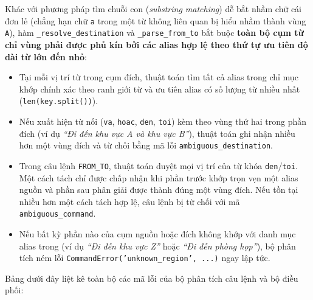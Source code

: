 Khác với phương pháp tìm chuỗi con (\textit{substring matching}) dễ bắt nhầm chữ cái đơn lẻ (chẳng hạn chữ \texttt{a} trong một từ không liên quan bị hiểu nhầm thành vùng \texttt{A}), hàm \texttt{\_resolve\_destination} và \texttt{\_parse\_from\_to} bắt buộc \textbf{toàn bộ cụm từ chỉ vùng phải được phủ kín bởi các alias hợp lệ theo thứ tự ưu tiên độ dài từ lớn đến nhỏ}:
\begin{itemize}[leftmargin=1.2cm]
  \item Tại mỗi vị trí từ trong cụm đích, thuật toán tìm tất cả alias trong chỉ mục khớp chính xác theo ranh giới từ và ưu tiên alias có số lượng từ nhiều nhất (\texttt{len(key.split())}).
  \item Nếu xuất hiện từ nối (\texttt{va}, \texttt{hoac}, \texttt{den}, \texttt{toi}) kèm theo vùng thứ hai trong phần đích (ví dụ \textit{``Đi đến khu vực A và khu vực B''}), thuật toán ghi nhận nhiều hơn một vùng đích và từ chối bằng mã lỗi \texttt{ambiguous\_destination}.
  \item Trong câu lệnh \texttt{FROM\_TO}, thuật toán duyệt mọi vị trí của từ khóa \texttt{den}/\texttt{toi}. Một cách tách chỉ được chấp nhận khi phần trước khớp trọn vẹn một alias nguồn và phần sau phân giải được thành đúng một vùng đích. Nếu tồn tại nhiều hơn một cách tách hợp lệ, câu lệnh bị từ chối với mã \texttt{ambiguous\_command}.
  \item Nếu bất kỳ phần nào của cụm nguồn hoặc đích không khớp với danh mục alias trong  (ví dụ \textit{``Đi đến khu vực Z''} hoặc \textit{``Đi đến phòng họp''}), bộ phân tích ném lỗi \texttt{CommandError('unknown\_region', ...)} ngay lập tức.
\end{itemize}

Bảng dưới đây liệt kê toàn bộ các mã lỗi của bộ phân tích câu lệnh và bộ điều phối:

